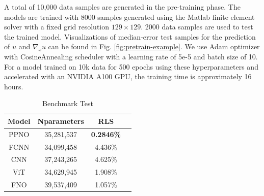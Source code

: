 \documentclass[preprint,11pt]{elsarticle}
\theoremstyle{plain}
\begin{document}
A total of 10,000 data samples are generated in the pre-training phase. The models are trained with 8000 samples generated using the Matlab finite element solver \cite{PDEToolbox} with a fixed grid resolution $129 \times 129$. 2000 data samples are used to test the trained model. Visualizations of median-error test samples for the prediction of $u$ and $\nabla_x{u}$ can be found in Fig. \ref{fig:pretrain-example}. We use Adam optimizer with CosineAnnealing scheduler with a learning rate of 5e-5 and batch size of 10. For a model trained on 10k data for 500 epochs using these hyperparameters and accelerated with an NVIDIA A100 GPU, the training time is approximately 16 hours.
\begin{table}[H]
    \centering
    \begin{tabular}{cccc}
    \hline
         Model & Nparameters & RLS\\ \hline
         PPNO & 35,281,537 & \textbf{0.2846\%} \\
         FCNN \cite{rumelhart1986learning} & 34,099,458 & 4.436\% \\
         CNN \cite{krizhevsky2012imagenet} & 37,243,265 & 4.625\% \\
         ViT \cite{dosovitskiy2020image} & 34,629,945 & 1.908\% \\
         FNO \cite{li2020fourier} & 39,537,409 & 1.057\% \\
    \hline
    \end{tabular}
    \caption{Benchmark Test}
    \label{tab:benchmarks}
\end{table}

\end{document}
